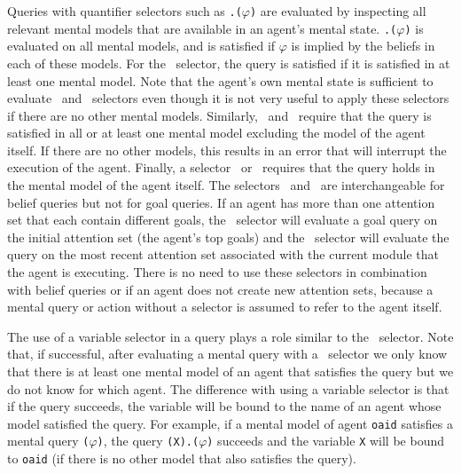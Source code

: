\documentclass{article}
\begin{document}
Queries with quantifier selectors such as \texttt{\allp.\belp($\varphi$)} are evaluated by inspecting all relevant mental models that are available in an agent's mental state. \texttt{\allp.\belp($\varphi$)} is evaluated on all mental models, and is satisfied if $\varphi$ is implied by the beliefs in each of these models. For the \somep\, selector, the query is satisfied if it is satisfied in at least one mental model. Note that the agent's own mental state is sufficient to evaluate \allp\, and \somep\, selectors even though it is not very useful to apply these selectors if there are no other mental models. Similarly, \allother\, and \someother\, require that the query is satisfied in all or at least one mental model excluding the model of the agent itself. If there are no other models, this results in an error that will interrupt the execution of the agent. Finally, a selector \self\, or \this\, requires that the query holds in the mental model of the agent itself. The selectors \self\, and \this\, are interchangeable for belief queries but not for goal queries. If an agent has more than one attention set that each contain different goals, the \self\, selector will evaluate a goal query on the initial attention set (the agent's top goals) and the \this\, selector will evaluate the query on the most recent attention set associated with the current module that the agent is executing. There is no need to use these selectors in combination with belief queries or if an agent does not create new attention sets, because a mental query or action without a selector is assumed to refer to the agent itself.

The use of a variable selector in a query plays a role similar to the \somep\, selector. Note that, if successful, after evaluating a mental query with a \somep\, selector we only know that there is at least one mental model of an agent that satisfies the query but we do not know for which agent. The difference with using a variable selector is that if the query succeeds, the variable will be bound to the name of an agent whose model satisfied the query. For example, if a mental model of agent \texttt{oaid} satisfies a mental query \texttt{\belp($\varphi$)}, the query \texttt{(X).\belp($\varphi$)} succeeds and the variable \texttt{X} will be bound to \texttt{oaid} (if there is no other model that also satisfies the query).
\end{document}
